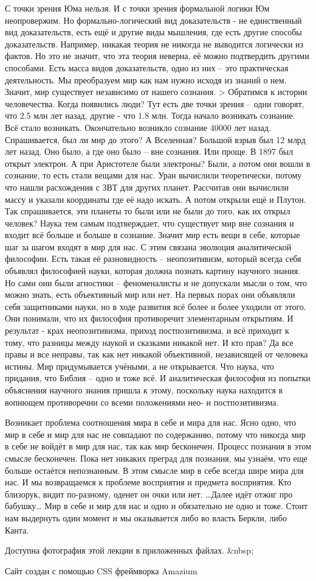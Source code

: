 С точки зрения Юма нельзя. И с точки зрения формальной логики Юм неопровержим. Но формально-логический вид доказательств - не единственный вид доказательств, есть ещё и другие виды мышления, где есть другие способы доказательств. Например, никакая теория не никогда не выводится логически из фактов. Но это не значит, что эта теория неверна, её можно подтвердить другими способами. Есть масса видов доказательств, одно из них – это практическая деятельность. Мы преобразуем мир как нам нужно исходя из знаний о нем. Значит, мир существует независимо от нашего сознания. > Обратимся к истории человечества. Когда появились люди? Тут есть две точки зрения – одни говорят, что 2.5 млн лет назад, другие - что 1.8 млн. Тогда начало возникать сознание. Всё стало возникать. Окончательно возникло сознание 40000 лет назад. Спрашивается, был ли мир до этого? А Вселенная? Большой взрыв был 12 млрд лет назад. Оно было, а где оно было – вне сознания. Или проще. В 1897 был открыт электрон. А при Аристотеле были электроны? Были, а потом они вошли в сознание, то есть стали вещами для нас. Уран вычислили теоретически, потому что нашли расхождения с ЗВТ для других планет. Рассчитав они вычислили массу и указали координаты где её надо искать. А потом открыли ещё и Плутон. Так спрашивается, эти планеты то были или не были до того, как их открыл человек? Наука тем самым подтверждает, что существует мир вне сознания и входит всё больше и больше в сознание. Значит мир есть вещи в себе, которые шаг за шагом входят в мир для нас. С этим связана эволюция аналитической философии. Есть такая её разновидность – неопозитивизм, который всегда себя объявлял философией науки, которая должна познать картину научного знания. Но сами они были агностики – феноменалисты и не допускали мысли о том, что можно знать, есть объективный мир или нет. На первых порах они объявляли себя защитниками науки, но в ходе развития всё более и более уходили от этого. Они понимали, что их философия противоречит элементарным открытиям. И результат - крах неопозитивизма, приход постпозитивизма, и всё приходит к тому, что разницы между наукой и сказками никакой нет. И кто прав? Да все правы и все неправы, так как нет никакой объективной, независящей от человека истины. Мир придумывается учёными, а не открывается. Что наука, что придания, что Библия – одно и тоже всё. И аналитическая философия из попытки объяснения научного знания пришла к этому, поскольку наука находится в вопиющем противоречии со всеми положениями нео- и постпозитивизма.

Возникает проблема соотношения мира в себе и мира для нас. Ясно одно, что мир в себе и мир для нас не совпадают по содержанию, потому что никогда мир в себе не войдёт в мир для нас, так как мир бесконечен. Процесс познания в этом смысле бесконечен. Пока нет никаких преград для познания, мы узнаём, что еще больше остаётся непознанным. В этом смысле мир в себе всегда шире мира для нас. И мы возвращаемся к проблеме восприятия и предмета восприятия. Кто близорук, видит по-разному, оденет он очки или нет. …Далее идёт отжиг про бабушку… Мир в себе и мир для нас и одно и обязательно не одно и тоже. Стоит нам выдернуть один момент и мы оказывается либо во власть Беркли, либо Канта.

Доступна фотография этой лекции в приложенных файлах. &nbsp;

Сайт создан с помощью CSS фреймворка Amazium
